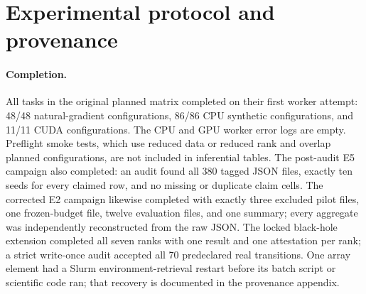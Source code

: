 \documentclass[11pt]{article}
\begin{document}
\section{Experimental protocol and provenance}
\label{sec:protocol}

\paragraph{Completion.}
All tasks in the original planned matrix completed on their first worker
attempt:
48/48 natural-gradient configurations, 86/86 CPU synthetic configurations,
and 11/11 CUDA configurations.  The CPU and GPU worker error logs are empty.
Preflight smoke tests, which use reduced data or reduced rank and overlap
planned configurations, are not included in inferential tables.
The post-audit E5 campaign also completed: an audit found all 380 tagged JSON
files, exactly ten seeds for every claimed row, and no missing or duplicate
claim cells.  The corrected E2 campaign likewise completed with exactly three
excluded pilot files, one frozen-budget file, twelve evaluation files, and
one summary; every aggregate was independently reconstructed from the raw
JSON.
The locked black-hole extension completed all seven ranks with one result and
one attestation per rank; a strict write-once audit accepted all 70
predeclared real transitions.  One array element had a Slurm
environment-retrieval restart before its batch script or scientific code ran;
that recovery is documented in the provenance appendix.
\end{document}
